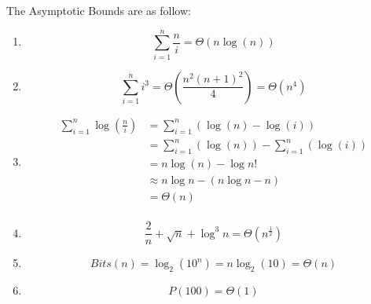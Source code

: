 \begin{homeworkProblem}

The Asymptotic Bounds are as follow:
\begin{enumerate}[label=(\alph*)]
\item
\begin{equation}
\sum_{i=1}^{n}{\frac{n}{i}} = \Theta\left(n\log(n)\right)
\end{equation}

\item
\begin{equation}\sum_{i=1}^{n}{i^3} = \Theta\left(\frac{n^2(n+1)^2}{4}\right) = \Theta\left(n^4\right)
\end{equation}

\item
\begin{equation}
\begin{split}
\sum_{i=1}^{n}{\log(\frac{n}{i})} & = \sum_{i=1}^{n}({\log(n) - \log(i)}) \\
& = \sum_{i=1}^{n}({\log(n)}) - \sum_{i=1}^{n}({\log(i)}) \\
& = n\log(n) - \log n! \\
& \approx n\log n - (n\log n - n) \\
& = \Theta(n) \\
\end{split}
\end{equation}

\item
\begin{equation}
\frac{2}{n} + \sqrt{n} + \log ^3 n = \Theta\left(n^{\frac{1}{2}}\right)
\end{equation}

\item
\begin{equation}
Bits(n) = \log_2(10^n) = n \log_2(10) = \Theta(n)
\end{equation}

\item
\begin{equation}
P(100) = \Theta(1)
\end{equation}

\end{enumerate}

\end{homeworkProblem}

\pagebreak
